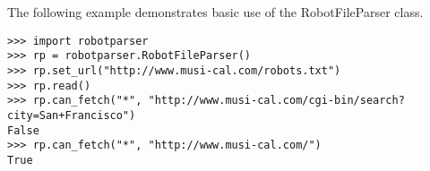 The following example demonstrates basic use of the RobotFileParser class.

\begin{verbatim}
>>> import robotparser
>>> rp = robotparser.RobotFileParser()
>>> rp.set_url("http://www.musi-cal.com/robots.txt")
>>> rp.read()
>>> rp.can_fetch("*", "http://www.musi-cal.com/cgi-bin/search?city=San+Francisco")
False
>>> rp.can_fetch("*", "http://www.musi-cal.com/")
True
\end{verbatim}
